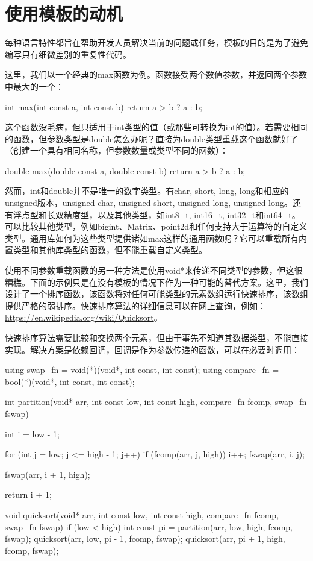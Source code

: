 \section{使用模板的动机}
每种语言特性都旨在帮助开发人员解决当前的问题或任务，模板的目的是为了避免编写只有细微差别的重复性代码。

这里，我们以一个经典的max函数为例。函数接受两个数值参数，并返回两个参数中最大的一个：

\begin{cpp}
int max(int const a, int const b)
{
	return a > b ? a : b;
}
\end{cpp}

这个函数没毛病，但只适用于int类型的值（或那些可转换为int的值）。若需要相同的函数，但参数类型是double怎么办呢？直接为double类型重载这个函数就好了（创建一个具有相同名称，但参数数量或类型不同的函数）：

\begin{cpp}
double max(double const a, double const b)
{
	return a > b ? a : b;
}
\end{cpp}

然而，int和double并不是唯一的数字类型。有char, short, long, long和相应的unsigned版本，unsigned char, unsigned short, unsigned long, unsigned long。还有浮点型和长双精度型，以及其他类型，如int8\_t, int16\_t, int32\_t和int64\_t。可以比较其他类型，例如bigint、Matrix、point2d和任何支持大于运算符的自定义类型。通用库如何为这些类型提供诸如max这样的通用函数呢？它可以重载所有内置类型和其他库类型的函数，但不能重载自定义类型。

使用不同参数重载函数的另一种方法是使用void*来传递不同类型的参数，但这很糟糕。下面的示例只是在没有模板的情况下作为一种可能的替代方案。这里，我们设计了一个排序函数，该函数将对任何可能类型的元素数组运行快速排序，该数组提供严格的弱排序。快速排序算法的详细信息可以在网上查询，例如：\url{https://en.wikipedia.org/wiki/Quicksort}。

快速排序算法需要比较和交换两个元素，但由于事先不知道其数据类型，不能直接实现。解决方案是依赖回调，回调是作为参数传递的函数，可以在必要时调用：

\begin{cpp}
using swap_fn = void(*)(void*, int const, int const);
using compare_fn = bool(*)(void*, int const, int const);

int partition(void* arr, int const low, int const high,
			  compare_fn fcomp, swap_fn fswap)
{
	int i = low - 1;
	
	for (int j = low; j <= high - 1; j++)
	{
		if (fcomp(arr, j, high))
		{
			i++;
			fswap(arr, i, j);
		}
	}

	fswap(arr, i + 1, high);
	
	return i + 1;
}

void quicksort(void* arr, int const low, int const high,
			   compare_fn fcomp, swap_fn fswap)
{
	if (low < high)
	{
		int const pi = partition(arr, low, high, fcomp,
			fswap);
		quicksort(arr, low, pi - 1, fcomp, fswap);
		quicksort(arr, pi + 1, high, fcomp, fswap);
	}
}
\end{cpp}

